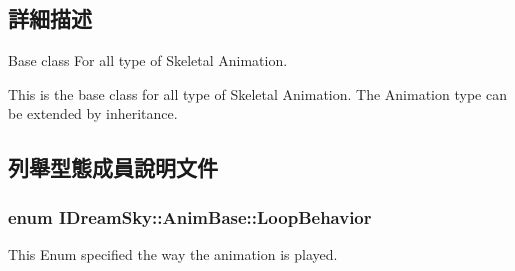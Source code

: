 \subsection{詳細描述}
Base class For all type of Skeletal Animation. 

This is the base class for all type of Skeletal Animation. The Animation type can be extended by inheritance. 

\subsection{列舉型態成員說明文件}
\subsubsection[{\texorpdfstring{Loop\+Behavior}{LoopBehavior}}]{\setlength{\rightskip}{0pt plus 5cm}enum {\bf I\+Dream\+Sky\+::\+Anim\+Base\+::\+Loop\+Behavior}}\hypertarget{class_i_dream_sky_1_1_anim_base_aac1c8b7253df068cf02101dcd4f586e2}{}\label{class_i_dream_sky_1_1_anim_base_aac1c8b7253df068cf02101dcd4f586e2}


This Enum specified the way the animation is played. 


